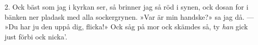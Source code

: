 \kern-5mm
2.  Ock bäst som jag i kyrkan ser,
    så brinner jag så röd i synen,
    ock dosan for i bänken ner
    pladask med alla sockergrynen.
    »Var är min handske?» sa jag då. —
    »Du har ju den uppå dig, flicka!»
    Ock såg på mor ock skämdes så,
    ty \textit{han} gick just förbi ock nicka’.
